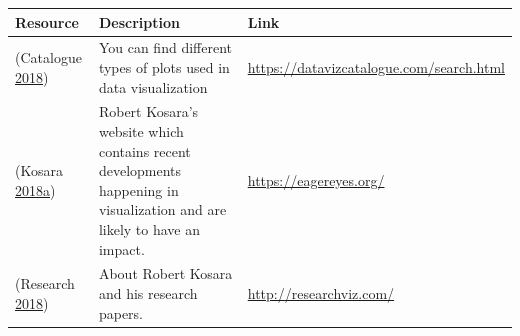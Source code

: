 \documentclass[]{book}
\begin{document}
\begin{longtable}[]{@{}lll@{}}
\toprule
\begin{minipage}[b]{0.15\columnwidth}\raggedright\strut
\textbf{Resource}\strut
\end{minipage} & \begin{minipage}[b]{0.28\columnwidth}\raggedright\strut
\textbf{Description}\strut
\end{minipage} & \begin{minipage}[b]{0.48\columnwidth}\raggedright\strut
\textbf{Link}\strut
\end{minipage}\tabularnewline
\midrule
\endhead
\begin{minipage}[t]{0.15\columnwidth}\raggedright\strut
(Catalogue \protect\hyperlink{ref-charts_viz}{2018})\strut
\end{minipage} & \begin{minipage}[t]{0.28\columnwidth}\raggedright\strut
You can find different types of plots used in data visualization\strut
\end{minipage} & \begin{minipage}[t]{0.48\columnwidth}\raggedright\strut
\url{https://datavizcatalogue.com/search.html}\strut
\end{minipage}\tabularnewline
\begin{minipage}[t]{0.15\columnwidth}\raggedright\strut
(Kosara
\protect\hyperlink{ref-eagereyes_viz}{2018}\protect\hyperlink{ref-eagereyes_viz}{a})\strut
\end{minipage} & \begin{minipage}[t]{0.28\columnwidth}\raggedright\strut
Robert Kosara's website which contains recent developments happening in
visualization and are likely to have an impact.\strut
\end{minipage} & \begin{minipage}[t]{0.48\columnwidth}\raggedright\strut
\url{https://eagereyes.org/}\strut
\end{minipage}\tabularnewline
\begin{minipage}[t]{0.15\columnwidth}\raggedright\strut
(Research \protect\hyperlink{ref-research_viz}{2018})\strut
\end{minipage} & \begin{minipage}[t]{0.28\columnwidth}\raggedright\strut
About Robert Kosara and his research papers.\strut
\end{minipage} & \begin{minipage}[t]{0.48\columnwidth}\raggedright\strut
\url{http://researchviz.com/}\strut
\end{minipage}\tabularnewline

\end{longtable}
\end{document}
